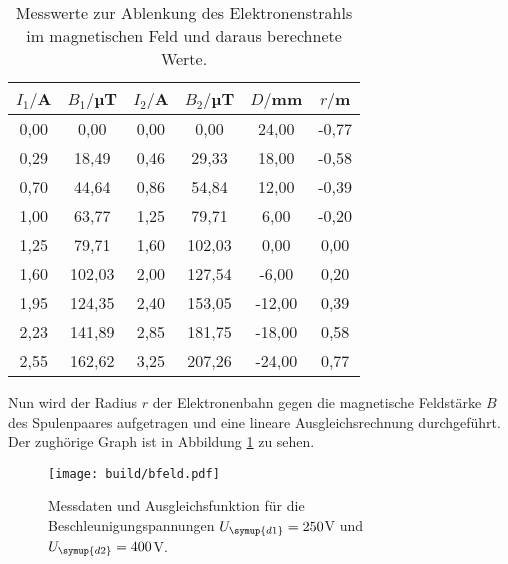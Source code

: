 \begin{table}[htp]
	\begin{center}
    \caption{Messwerte zur Ablenkung des Elektronenstrahls im magnetischen Feld und
    daraus berechnete Werte.}
    \label{tab:magnetisch}
		\begin{tabular}{cccccc}
		\toprule
			{$I_1/$A} & {$B_1/$µT} & {$I_2/$A} & {$B_2/$µT} & {$D/$mm} & {$r/$m}\\
			\midrule
			0,00 & 0,00  & 0,00 &  0,00 & 24,00 & -0,77\\
			0,29 & 18,49 & 0,46 & 29,33 & 18,00 & -0,58\\
			0,70 & 44,64 & 0,86 & 54,84 & 12,00 & -0,39\\
			1,00 & 63,77 & 1,25 & 79,71 & 6,00 & -0,20\\
			1,25 & 79,71 & 1,60 & 102,03 & 0,00 & 0,00\\
			1,60 & 102,03 & 2,00 & 127,54 & -6,00 & 0,20\\
			1,95 & 124,35 & 2,40 & 153,05 & -12,00 & 0,39\\
			2,23 & 141,89 & 2,85 & 181,75 & -18,00 & 0,58\\
			2,55 & 162,62 & 3,25 & 207,26 & -24,00 & 0,77\\
		\bottomrule
		\end{tabular}
	\end{center}
\end{table}

Nun wird der Radius $r$ der Elektronenbahn gegen die magnetische Feldstärke $B$
des Spulenpaares aufgetragen und eine lineare Ausgleichsrechnung durchgeführt.
Der zughörige Graph ist in Abbildung \ref{fig:bfeld} zu sehen.

\begin{figure}[h]
  \centering
  \texttt{[image: build/bfeld.pdf]}
  \caption{Messdaten und Ausgleichsfunktion für die Beschleunigungspannungen
  $U_{\symup{d1}}=250$V und $U_{\symup{d2}}=400$V.}
  \label{fig:bfeld}
\end{figure}
